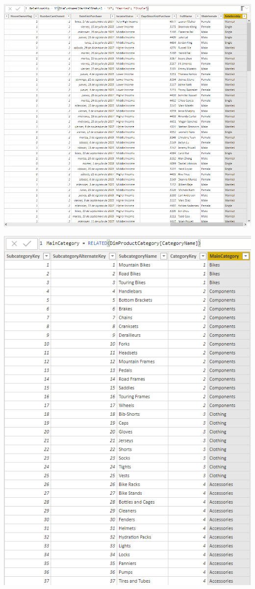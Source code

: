 \begin{center}
\includegraphics[width=20cm]{./Imagenes/CapturaNro07}
\end{center}

\begin{center}
\includegraphics[width=20cm]{./Imagenes/CapturaNro08}
\end{center}

